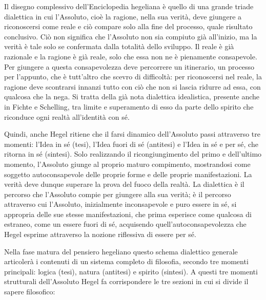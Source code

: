\documentclass[a4paper,12pt,oneside,openany]{book}%
\begin{document}
Il disegno complessivo dell’Enciclopedia hegeliana è quello di una grande triade dialettica in cui l’Assoluto, cioè la ragione, nella sua verità, deve giungere a riconoscersi come reale e ciò compare solo alla fine del processo, quale risultato conclusivo. Ciò non significa che l’Assoluto non sia compiuto già all’inizio, ma la verità è tale solo se confermata dalla totalità dello sviluppo. Il reale è già razionale e la ragione è già reale, solo che essa non ne è pienamente consapevole. Per giungere a questa consapevolezza deve percorrere un itinerario, un processo per l’appunto, che è tutt’altro che scevro di difficoltà: per riconoscersi nel reale, la ragione deve scontrarsi innanzi tutto con ciò che non si lascia ridurre ad essa, con qualcosa che la nega. Si tratta della già nota dialettica idealistica, presente anche in Fichte e Schelling, tra limite e superamento di esso da parte dello spirito che riconduce ogni realtà all’identità con sé.

Quindi, anche Hegel ritiene che il farsi dinamico dell’Assoluto passi attraverso tre momenti: l’Idea in sé (tesi), l’Idea fuori di sé (antitesi) e l’Idea in sé e per sé, che ritorna in sé (sintesi). Solo realizzando il ricongiungimento del primo e dell’ultimo momento, l’Assoluto giunge al proprio maturo compimento, mostrandosi come soggetto autoconsapevole delle proprie forme e delle proprie manifestazioni. La verità deve dunque superare la prova del fuoco della realtà. La dialettica è il percorso che l’Assoluto compie per giungere alla sua verità; è il percorso attraverso cui l’Assoluto, inizialmente inconsapevole e puro essere in sé, si appropria delle sue stesse manifestazioni, che prima esperisce come qualcosa di estraneo, come un essere fuori di sé, acquisendo quell’autoconsapevolezza che Hegel esprime attraverso la nozione riflessiva di essere per sé.

Nella fase matura del pensiero hegeliano questo schema dialettico generale articolerà i contenuti di un sistema completo di filosofia, secondo tre momenti principali: logica (tesi), natura (antitesi) e spirito (sintesi). A questi tre momenti strutturali dell’Assoluto Hegel fa corrispondere le tre sezioni in cui si divide il sapere filosofico:
\end{document}
